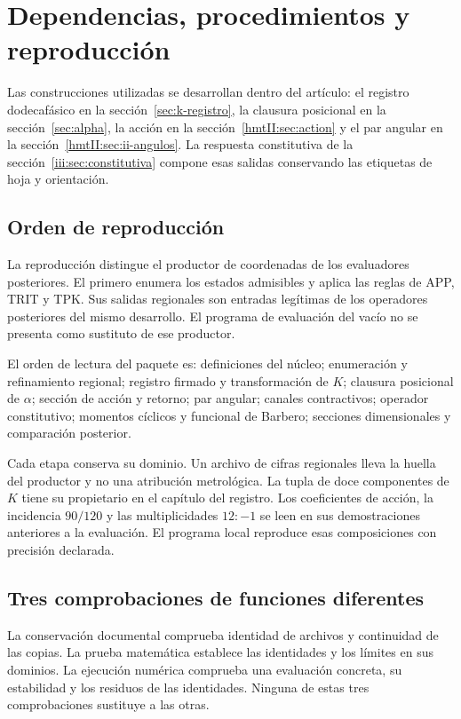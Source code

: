 \section{Dependencias, procedimientos y reproducción}

Las construcciones utilizadas se desarrollan dentro del artículo:
el registro dodecafásico en la sección~\ref{sec:k-registro}, la clausura
posicional en la sección~\ref{sec:alpha}, la acción en la
sección~\ref{hmtII:sec:action} y el par angular en la
sección~\ref{hmtII:sec:ii-angulos}. La respuesta constitutiva de la
sección~\ref{iii:sec:constitutiva} compone esas salidas conservando
las etiquetas de hoja y orientación.

\subsection{Orden de reproducción}

La reproducción distingue el productor de coordenadas de los evaluadores
posteriores. El primero enumera los estados admisibles y aplica las reglas
de APP, TRIT y TPK. Sus salidas regionales son entradas legítimas de los
operadores posteriores del mismo desarrollo. El programa de evaluación
del vacío no se presenta como sustituto de ese productor.

El orden de lectura del paquete es: definiciones del núcleo; enumeración
y refinamiento regional; registro firmado y transformación de $K$;
clausura posicional de $\alpha$; sección de acción y retorno; par angular;
canales contractivos; operador constitutivo; momentos cíclicos y funcional
de Barbero; secciones dimensionales y comparación posterior.

Cada etapa conserva su dominio. Un archivo de cifras regionales lleva la
huella del productor y no una atribución metrológica. La tupla de doce
componentes de $K$ tiene su propietario en el capítulo del registro. Los
coeficientes de acción, la incidencia $90/120$ y las multiplicidades
$12:-1$ se leen en sus demostraciones anteriores a la evaluación. El
programa local reproduce esas composiciones con precisión declarada.

\subsection{Tres comprobaciones de funciones diferentes}

La conservación documental comprueba identidad de archivos y continuidad
de las copias. La prueba matemática establece las identidades y los límites
en sus dominios. La ejecución numérica comprueba una evaluación concreta,
su estabilidad y los residuos de las identidades. Ninguna de estas tres
comprobaciones sustituye a las otras.

